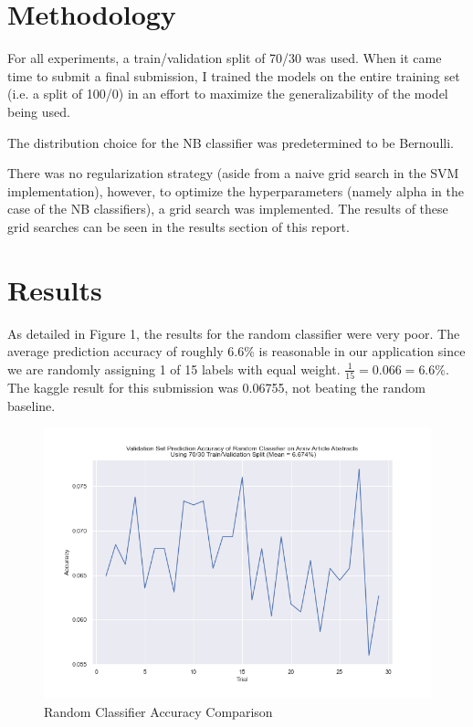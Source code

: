 \documentclass[a4paper,12pt]{article}
\begin{document}
\section{Methodology}

For all experiments, a train/validation split of 70/30 was used. When it came time to submit a final submission, I trained the models on the entire training set (i.e. a split of 100/0) in an effort to maximize the generalizability of the model being used. 

\medskip

The distribution choice for the NB classifier was predetermined to be Bernoulli. 

\medskip

There was no regularization strategy (aside from a naive grid search in the SVM implementation), however, to optimize the hyperparameters (namely alpha in the case of the NB classifiers), a grid search was implemented. The results of these grid searches can be seen in the results section of this report.

\section{Results}

As detailed in Figure 1, the results for the random classifier were very poor. The average prediction accuracy of roughly 6.6\% is reasonable in our application since we are randomly assigning 1 of 15 labels with equal weight. $\frac{1}{15} = 0.066 = 6.6\%$. The kaggle result for this submission was 0.06755, not beating the random baseline.

\begin{figure}[H]
    \centering
    \caption{Random Classifier Accuracy Comparison}
    \includegraphics[width=12cm]{compareRandom.png}    
\end{figure}
\end{document}
